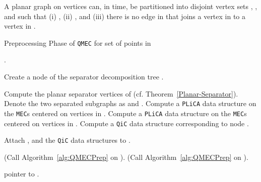 \documentclass[12pt]{llncs}
\begin{document}
\begin{theorem}\label{Planar-Separator} \cite{LT79}
A planar graph  on  vertices can, in  time, be partitioned into disjoint 
vertex sets , 
, and  such that (i) , (ii) , and (iii) 
there is no edge in  that joins a vertex in  to a vertex in . 
\end{theorem}







\newcommand{\gin}{{G_{\text{in}}}}
\newcommand{\win}{{W_{\text{in}}}}
\begin{algorithm}[h!]
\caption{Preprocessing Phase of {\tt QMEC} for set  of points in }
\label{alg:QMECPrep}
\begin{algorithmic}[1]
.
\ENDIF

\STATE Create a node  of the separator decomposition tree .

\STATE Compute the planar separator vertices  of  (cf. Theorem\ 
\ref{Planar-Separator}). Denote the two separated subgraphs as  and .
\STATE Compute a {\tt PLiCA} data structure  on the {\tt MEC}s centered on 
vertices in . 
\STATE Compute a {\tt PLiCA} data structure  on the {\tt MEC}s centered on 
vertices in .
\STATE Compute a {\tt QiC} data structure corresponding to node . 

\STATE Attach ,  and the {\tt QiC} data structures to . 

\STATE  (Call Algorithm\ \ref{alg:QMECPrep} on ).
\STATE  (Call Algorithm\ \ref{alg:QMECPrep} on ).

\RETURN pointer to .

\end{algorithmic}
\end{algorithm}
\end{document}
